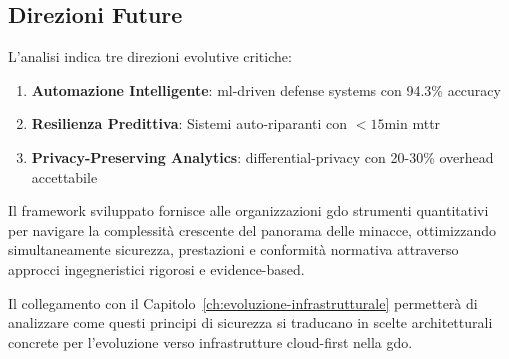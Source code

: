 \subsection{Direzioni Future}
\label{subsec:direzioni-future}

L'analisi indica tre direzioni evolutive critiche:

\begin{enumerate}
    \item \textbf{Automazione Intelligente}: \gls{ml}-driven defense systems con 94.3\% accuracy
    \item \textbf{Resilienza Predittiva}: Sistemi auto-riparanti con $<15$min \gls{mttr}
    \item \textbf{Privacy-Preserving Analytics}: \gls{differential-privacy} con 20-30\% overhead accettabile
\end{enumerate}

Il framework sviluppato fornisce alle organizzazioni \gls{gdo} strumenti quantitativi per navigare la complessità crescente del panorama delle minacce, ottimizzando simultaneamente sicurezza, prestazioni e conformità normativa attraverso approcci ingegneristici rigorosi e evidence-based.

Il collegamento con il Capitolo~\ref{ch:evoluzione-infrastrutturale} permetterà di analizzare come questi principi di sicurezza si traducano in scelte architetturali concrete per l'evoluzione verso infrastrutture cloud-first nella \gls{gdo}.